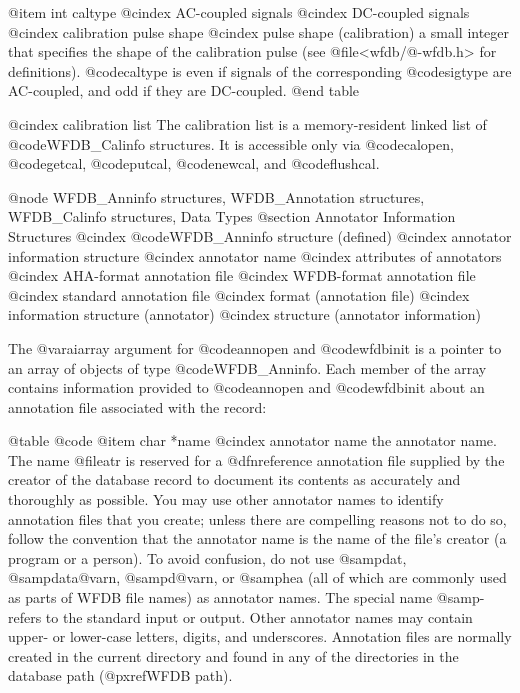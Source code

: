 {{{{{{{{{@item int caltype
@cindex AC-coupled signals
@cindex DC-coupled signals
@cindex calibration pulse shape
@cindex pulse shape (calibration)
a small integer that specifies the shape of the calibration pulse (see
@file{<wfdb/@-wfdb.h>} for definitions).  @code{caltype} is even if signals of
the corresponding @code{sigtype} are AC-coupled, and odd if they are
DC-coupled.
@end table

@cindex calibration list
The calibration list is a memory-resident linked list of @code{WFDB_Calinfo}
structures.  It is accessible only via @code{calopen}, @code{getcal},
@code{putcal}, @code{newcal}, and @code{flushcal}.

@node WFDB_Anninfo structures, WFDB_Annotation structures, WFDB_Calinfo structures, Data Types
@section Annotator Information Structures
@cindex @code{WFDB_Anninfo} structure (defined)
@cindex annotator information structure
@cindex annotator name
@cindex attributes of annotators
@cindex AHA-format annotation file
@cindex WFDB-format annotation file
@cindex standard annotation file
@cindex format (annotation file)
@cindex information structure (annotator)
@cindex structure (annotator information)

The @var{aiarray} argument for @code{annopen} and @code{wfdbinit} is a
pointer to an array of objects of type @code{WFDB_Anninfo}.  Each member
of the array contains information provided to @code{annopen} and
@code{wfdbinit} about an annotation file associated with the
record:

@table @code
@item char *name
@cindex annotator name
the annotator name.  The name @file{atr} is reserved for a @dfn{reference
annotation file} supplied by the creator of the database record to document its
contents as accurately and thoroughly as possible.  You may use other annotator
names to identify annotation files that you create; unless there are compelling
reasons not to do so, follow the convention that the annotator name is the name
of the file's creator (a program or a person).  To avoid confusion, do not use
@samp{dat}, @samp{data@var{n}}, @samp{d@var{n}}, or @samp{hea}
(all of which are commonly used as parts of WFDB file names) as annotator
names.  The special name @samp{-} refers to the standard input or output.
Other annotator names may contain upper- or lower-case letters, digits, and
underscores.  Annotation files are normally created in the current directory
and found in any of the directories in the database path (@pxref{WFDB path}).

}}}}}}}}}
